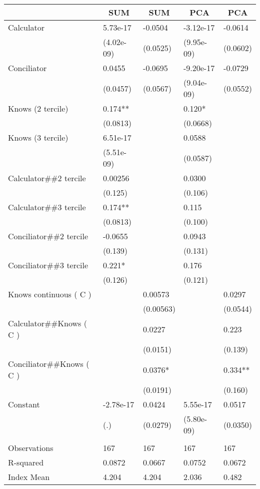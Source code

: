 \begin{tabular}{lllll}
\toprule
      & \multicolumn{1}{c}{SUM} & \multicolumn{1}{c}{SUM} & \multicolumn{1}{c}{PCA} & \multicolumn{1}{c}{PCA} \\
\midrule
\midrule
Calculator & 5.73e-17 & -0.0504 & -3.12e-17 & -0.0614 \\
      & (4.02e-09) & (0.0525) & (9.95e-09) & (0.0602) \\
Conciliator  & 0.0455 & -0.0695 & -9.20e-17 & -0.0729 \\
      & (0.0457) & (0.0567) & (9.04e-09) & (0.0552) \\
Knows (2 tercile) & 0.174** &       & 0.120* &  \\
      & (0.0813) &       & (0.0668) &  \\
Knows (3 tercile) & 6.51e-17 &       & 0.0588 &  \\
      & (5.51e-09) &       & (0.0587) &  \\
Calculator\#\#2 tercile & 0.00256 &       & 0.0300 &  \\
      & (0.125) &       & (0.106) &  \\
Calculator\#\#3 tercile & 0.174** &       & 0.115 &  \\
      & (0.0813) &       & (0.100) &  \\
Conciliator\#\#2 tercile & -0.0655 &       & 0.0943 &  \\
      & (0.139) &       & (0.131) &  \\
Conciliator\#\#3 tercile & 0.221* &       & 0.176 &  \\
      & (0.126) &       & (0.121) &  \\
Knows continuous ( C ) &       & 0.00573 &       & 0.0297 \\
      &       & (0.00563) &       & (0.0544) \\
Calculator\#\#Knows ( C ) &       & 0.0227 &       & 0.223 \\
      &       & (0.0151) &       & (0.139) \\
Conciliator\#\#Knows ( C ) &       & 0.0376* &       & 0.334** \\
      &       & (0.0191) &       & (0.160) \\
Constant  & -2.78e-17 & 0.0424 & 5.55e-17 & 0.0517 \\
      & (.)   & (0.0279) & (5.80e-09) & (0.0350) \\
      &       &       &       &  \\
\midrule
Observations & 167   & 167   & 167   & 167 \\
R-squared & 0.0872 & 0.0667 & 0.0752 & 0.0672 \\
Index Mean & 4.204 & 4.204 & 2.036 & 0.482 \\
\bottomrule
\bottomrule
\end{tabular}%
